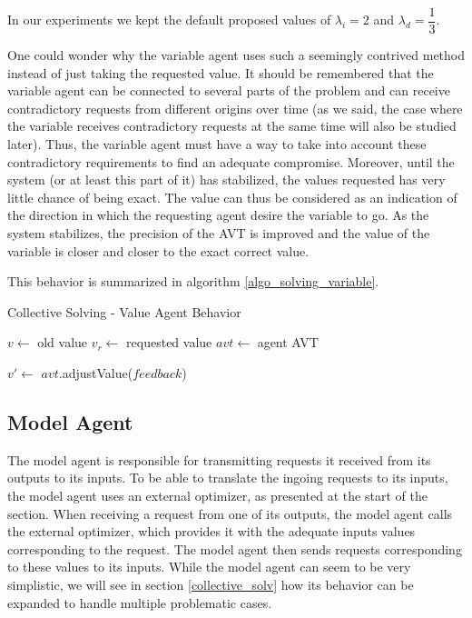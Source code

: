 In our experiments we kept the default proposed values of $\lambda_i = 2$ and  $\lambda_d = \dfrac{1}{3}$.

One could wonder why the variable agent uses such a seemingly contrived method instead of just taking the requested value. It should be remembered that the variable agent can be connected to several parts of the problem and can receive contradictory requests from different origins over time (as we said, the case where the variable receives contradictory requests at the same time will also be studied later). Thus, the variable agent must have a way to take into account these contradictory requirements to find an adequate compromise. Moreover, until the system (or at least this part of it) has stabilized, the values requested has very little chance of being exact. The value can thus be considered as an indication of the direction in which the requesting agent desire the variable to go. As the system stabilizes, the precision of the AVT is improved and the value of the variable is closer and closer to the exact correct value.

This behavior is summarized in algorithm \ref{algo_solving_variable}.

\begin{algorithm}
\caption{Collective Solving - Value Agent Behavior}
\label{algo_solving_variable}

	$v \leftarrow$ old value\;
	$v_r \leftarrow$ requested value\;
	$avt \leftarrow$ agent AVT \;
	
	$v' \leftarrow$ $avt$.adjustValue($feedback$)\;
	
\end{algorithm}

\subsection{Model Agent}\label{model_agent_solving}

The model agent is responsible for transmitting requests it received from its outputs to its inputs. To be able to translate the ingoing requests to its inputs, the model agent uses an external optimizer, as presented at the start of the section. When receiving a request from one of its outputs, the model agent calls the external optimizer, which provides it with the adequate inputs values corresponding to the request. The model agent then sends requests corresponding to these values to its inputs.
While the model agent can seem to be very simplistic, we will see in section \ref{collective_solv} how its 
behavior can be expanded to handle multiple problematic cases.

